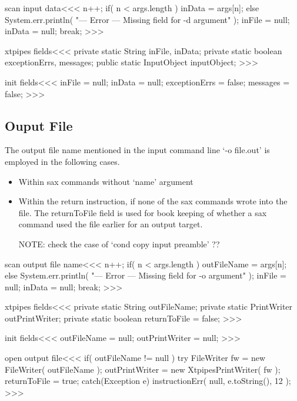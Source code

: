 \documentclass{article}
\begin{document}
{\<scan input data\><<<
n++;
if( n < args.length ){
   inData = args[n];
} else {
   System.err.println(
       "--- Error --- Missing field for -d argument" );
   inFile = null; inData = null; break;
}
>>>






\<xtpipes fields\><<<
private static String     inFile,
                          inData;
private static boolean exceptionErrs, messages;
public static InputObject inputObject;
>>>


\<init fields\><<<
inFile = null;
inData = null;
exceptionErrs = false;
messages = false;
>>>


\subsection{Ouput File}


The output file name mentioned in the input command line `-o file.out' is 
employed in the following cases.

\begin{itemize}
\item
Within sax commands without `name' argument

\item Within the return instruction, if none of the sax commands wrote
  into the file.  The returnToFile field is used for book keeping of
  whether a sax command used the file earlier for an output target.


NOTE: check the case of `cond copy input preamble' ??
\end{itemize}


\<scan output file name\><<<
n++;
if( n < args.length ){
   outFileName = args[n];
} else {
   System.err.println(
       "--- Error --- Missing field for -o argument" );
   inFile = null; inData = null; break;
}
>>>


\<xtpipes fields\><<<
private static String outFileName;
private static PrintWriter outPrintWriter;
private static boolean returnToFile = false;
>>>

\<init fields\><<<
outFileName = null;
outPrintWriter = null;
>>>



\<open output file\><<<
if( outFileName != null ){
   try { 
      FileWriter fw = new FileWriter( outFileName ); 
      outPrintWriter = new XtpipesPrintWriter( fw ); 
      returnToFile = true;
   } catch(Exception e){ 
      instructionErr( null, e.toString(), 12 ); 
}  }  
>>>

}
\end{document}
